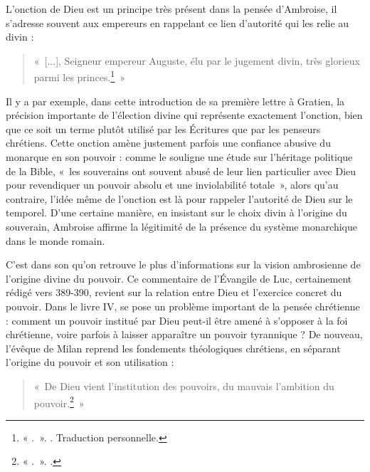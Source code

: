 \bigskip

L'onction de Dieu est un principe très présent dans la pensée d'Ambroise, il s'adresse souvent aux empereurs en rappelant ce lien d'autorité qui les relie au divin :

\bigskip

\begin{quote}
«~[...], Seigneur empereur Auguste, élu par le jugement divin, très glorieux parmi les princes.\footnote{« .~». \cite[\nopp ec. 12, 10]{ambroise_csel_82_3}. Traduction personnelle.}~»
\end{quote}

\bigskip

Il y a par exemple, dans cette introduction de sa première lettre à Gratien, la précision importante de l'élection divine qui représente exactement l'onction, bien que ce soit un terme plutôt utilisé par les Écritures que par les penseurs chrétiens. Cette onction amène justement parfois une confiance abusive du monarque en son pouvoir : comme le souligne une étude sur l'héritage politique de la Bible, «~les souverains ont souvent abusé de leur lien particulier avec Dieu pour revendiquer un pouvoir absolu et une inviolabilité totale\autocite{mordecai_racines}~», alors qu'au contraire, l'idée même de l'onction est là pour rappeler l'autorité de Dieu sur le temporel. D'une certaine manière, en insistant sur le choix divin à l'origine du souverain, Ambroise affirme la légitimité de la présence du système monarchique dans le monde romain.

\bigskip

C'est dans son  qu'on retrouve le plus d'informations sur la vision ambrosienne de l'origine divine du pouvoir. Ce commentaire de l'Évangile de Luc, certainement rédigé vers 389-390, revient sur la relation entre Dieu et l'exercice concret du pouvoir. Dans le livre IV, se pose un problème important de la pensée chrétienne : comment un pouvoir institué par Dieu peut-il être amené à s'opposer à la foi chrétienne, voire parfois à laisser apparaître un pouvoir tyrannique ? De nouveau, l'évêque de Milan reprend les fondements théologiques chrétiens, en séparant l'origine du pouvoir et son utilisation :

\bigskip

\begin{quote}
«~De Dieu vient l’institution des pouvoirs, du mauvais l’ambition du pouvoir.\footnote{« .~». \cite[\nopp IV, 29]{ambroise_csel_32_4}.}~»
\end{quote}


